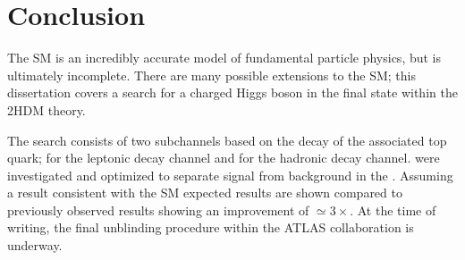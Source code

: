 \chapter{Conclusion}\label{chap:conclusions}
	The \acrlong{SM} is an incredibly accurate model of fundamental particle physics, but is ultimately incomplete. There are many possible extensions to the \acrlong{SM}; this dissertation covers a search for a charged Higgs boson in the \HpmLong final state within the \acrfull{2HDM} theory. 

	The search consists of two subchannels based on the decay of the associated top quark; \taulep for the leptonic decay channel and \taujets for the hadronic decay channel.  were investigated and optimized to separate signal from background in the . Assuming a result consistent with the \gls{SM} expected results are shown compared to previously observed results showing an improvement of $\simeq 3\times$. At the time of writing, the final unblinding procedure within the \gls{ATLAS} collaboration is underway.